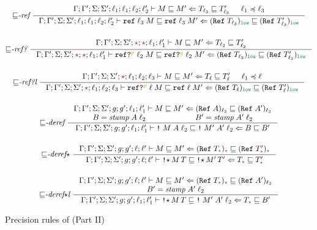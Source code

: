 \begin{figure}[tbp]
{\begin{gather*}
  \\[3ex]
    {\sqsubseteq}\textit{-ref}~
    \inference{\precctx{\Gamma}{\Gamma'}{\Sigma}{\Sigma'}{\ell_1}{\ell_1}{\ell_2}{\ell_2'}\ccprec{M}{M'}{T_{\ell_3}}{T'_{\ell_3}} &
               \ell_1 \preccurlyeq \ell_3}
              {\precctx{\Gamma}{\Gamma'}{\Sigma}{\Sigma'}{\ell_1}{\ell_1}{\ell_2}{\ell_2'}\ccprec{\ccref{\ell_3}{M}}{\ccref{\ell_3}{M'}}{(\Refer{T_{\ell_3}})_{\low}}{(\Refer{T'_{\ell_3}})_{\low}}}
  \\[3ex]
    {\sqsubseteq}\textit{-ref?}~
    \inference{\precctx{\Gamma}{\Gamma'}{\Sigma}{\Sigma'}{\unk}{\unk}{\ell_1}{\ell_1'}\ccprec{M}{M'}{T_{\ell_2}}{T'_{\ell_2}}}
              {\precctx{\Gamma}{\Gamma'}{\Sigma}{\Sigma'}{\unk}{\unk}{\ell_1}{\ell_1'}\ccprec{\ccrefproj{\ell_2}{M}{p}}{\ccrefproj{\ell_2}{M'}{q}}{(\Refer{T_{\ell_2}})_{\low}}{(\Refer{T'_{\ell_2}})_{\low}}}
  \\[3ex]
  {\sqsubseteq}\textit{-ref?l}~
  \inference{\precctx{\Gamma}{\Gamma'}{\Sigma}{\Sigma'}{\unk}{\ell_1}{\ell_2}{\ell_3}\ccprec{M}{M'}{T_\ell}{T'_\ell} &
             \ell_1 \preccurlyeq \ell}
  {\precctx{\Gamma}{\Gamma'}{\Sigma}{\Sigma'}{\unk}{\ell_1}{\ell_2}{\ell_3}\ccprec{\ccrefproj{\ell}{M}{p}}{\ccref{\ell}{M'}}{(\Refer{T_\ell})_{\low}}{(\Refer{T'_\ell})_{\low}}}
  \\[3ex]
  {\sqsubseteq}\textit{-deref}~
  \inference{\precctx{\Gamma}{\Gamma'}{\Sigma}{\Sigma'}{g}{g'}{\ell_1}{\ell_1'}\ccprec{M}{M'}{(\Refer{A})_{\ell_2}}{(\Refer{A'})_{\ell_2}} \\
  B = \mathit{stamp}\;A\;\ell_2 & B' = \mathit{stamp}\;A'\;\ell_2}
  {\precctx{\Gamma}{\Gamma'}{\Sigma}{\Sigma'}{g}{g'}{\ell_1}{\ell_1'}\ccprec{\ccderef{M}{A}{\ell_2}}{\ccderef{M'}{A'}{\ell_2}}{B}{B'}}
  \\[3ex]
    {\sqsubseteq}\textit{-deref}{\star}~
    \inference{\precctx{\Gamma}{\Gamma'}{\Sigma}{\Sigma'}{g}{g'}{\ell}{\ell'}\ccprec{M}{M'}{(\Refer{T_{\unk}})_{\unk}}{(\Refer{T'_{\unk}})_{\unk}}}
              {\precctx{\Gamma}{\Gamma'}{\Sigma}{\Sigma'}{g}{g'}{\ell}{\ell'}\ccprec{\ccderefstar{M}{T}}{\ccderefstar{M'}{T'}}{T_{\unk}}{T'_{\unk}}}
  \\[3ex]
    {\sqsubseteq}\textit{-deref${\star}$l}~
    \inference{\precctx{\Gamma}{\Gamma'}{\Sigma}{\Sigma'}{g}{g'}{\ell}{\ell'}\ccprec{M}{M'}{(\Refer{T_{\unk}})_{\unk}}{(\Refer{A'})_{\ell_2}} \\
               B' = \mathit{stamp}\;A'\;\ell_2}
              {\precctx{\Gamma}{\Gamma'}{\Sigma}{\Sigma'}{g}{g'}{\ell_1}{\ell_1'}\ccprec{\ccderefstar{M}{T}}{\ccderef{M'}{A'}{\ell_2}}{T_{\unk}}{B'}}
  \end{gather*}}
  \caption{Precision rules of \CC (Part II)}
  \label{fig:cc-prec-2}
\end{figure}


